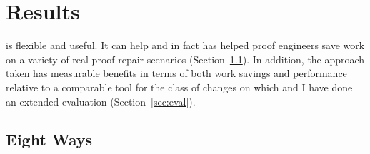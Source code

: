 \section{Results}
\label{sec:pi-results}



\toolnamec is flexible and useful.
It can help and in fact has helped proof engineers save work on a variety of real proof repair scenarios (Section~\ref{sec:results}).
In addition, the approach taken has measurable benefits in terms of both work savings and performance
relative to a comparable tool for the class of changes on which  and I have done an extended evaluation (Section~\ref{sec:eval}).

\subsection{\toolnamec Eight Ways}
\label{sec:results}

